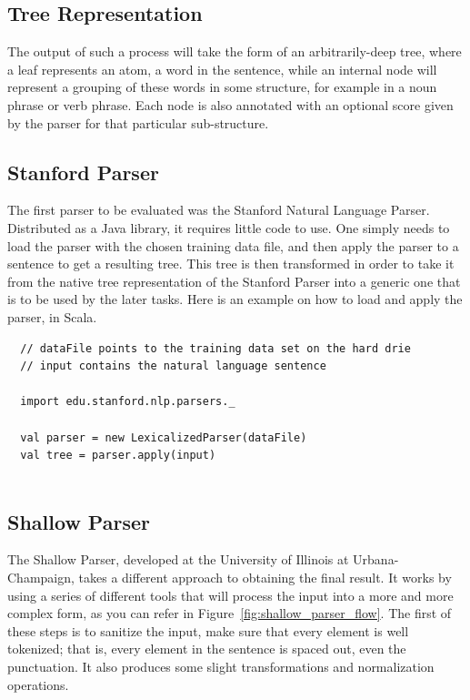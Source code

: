 \subsection{Tree Representation} %
\label{sub:tree_representation}

The output of such a process will take the form of an arbitrarily-deep tree, where a leaf represents an atom, a word in the sentence, while an internal node will represent a grouping of these words in some structure, for example in a noun phrase or verb phrase. Each node is also annotated with an optional score given by the parser for that particular sub-structure.


\subsection{Stanford Parser} %
\label{sub:stanford_parser_impl}

The first parser to be evaluated was the Stanford Natural Language Parser. Distributed as a Java library, it requires little code to use. One simply needs to load the parser with the chosen training data file, and then apply the parser to a sentence to get a resulting tree. This tree is then transformed in order to take it from the native tree representation of the Stanford Parser into a generic one that is to be used by the later tasks. Here is an example on how to load and apply the parser, in Scala.

\begin{verbatim}
  // dataFile points to the training data set on the hard drie
  // input contains the natural language sentence
  
  import edu.stanford.nlp.parsers._
  
  val parser = new LexicalizedParser(dataFile)
  val tree = parser.apply(input)
  
\end{verbatim}



\subsection{Shallow Parser} %
\label{sub:shallow_parser}

The Shallow Parser, developed at the University of Illinois at Urbana-Champaign, takes a different approach to obtaining the final result. It works by using a series of different tools that will process the input into a more and more complex form, as you can refer in Figure~\ref{fig:shallow_parser_flow}. The first of these steps is to sanitize the input, make sure that every element is well tokenized; that is, every element in the sentence is spaced out, even the punctuation. It also produces some slight transformations and normalization operations.


